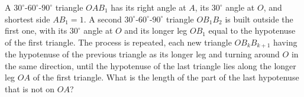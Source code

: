A $30^\circ$-$60^\circ$-$90^\circ$ triangle $OAB_1$ has its right angle at $A$, its $30^\circ$ angle at $O$, and shortest side $AB_1=1$. A second $30^\circ$-$60^\circ$-$90^\circ$ triangle $OB_1B_2$ is built outside the first one, with its $30^\circ$ angle at $O$ and its longer leg $OB_1$ equal to the hypotenuse of the first triangle. The process is repeated, each new triangle $OB_kB_{k+1}$ having the hypotenuse of the previous triangle as its longer leg and turning around $O$ in the same direction, until the hypotenuse of the last triangle lies along the longer leg $OA$ of the first triangle. What is the length of the part of the last hypotenuse that is not on $OA$?
